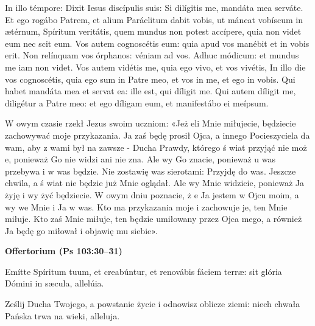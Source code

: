 \documentclass[10pt,a5paper]{book}
\newcommand{\oremus}[3]{\medskip\centerline{\textbf{#1}}\medskip
	\begin{sloppypar}
		\begin{paracol}{2}
			\setlength{\columnsep}{0em}
			\begin{leftcolumn}
				#2
			\end{leftcolumn}
			\begin{rightcolumn}
				#3
			\end{rightcolumn}
		\end{paracol}
	\end{sloppypar}}
\newcommand{\oremuss}[2]{
	\begin{sloppypar}
		\begin{paracol}{2}
			\setlength{\columnsep}{0em}
			\begin{leftcolumn}
				#1
			\end{leftcolumn}
			\begin{rightcolumn}
				#2
			\end{rightcolumn}
		\end{paracol}
	\end{sloppypar}}
\begin{document}
					\oremuss{
						In illo témpore: Dixit Iesus discípulis suis: Si dilígitis me, mandáta mea serváte. Et ego rogábo Patrem, et alium Paráclitum dabit vobis, ut máneat vobíscum in ætérnum, Spíritum veritátis, quem mundus non potest accípere, quia non videt eum nec scit eum. Vos autem cognoscétis eum: quia apud vos manébit et in vobis erit. Non relínquam vos órphanos: véniam ad vos. Adhuc módicum: et mundus me iam non videt. Vos autem vidétis me, quia ego vivo, et vos vivétis, In illo die vos cognoscétis, quia ego sum in Patre meo, et vos in me, et ego in vobis. Qui habet mandáta mea et servat ea: ille est, qui díligit me. Qui autem díligit me, diligétur a Patre meo: et ego díligam eum, et manifestábo ei meípsum.}{
						W owym czasie rzekł Jezus swoim uczniom: «Jeż eli Mnie miłujecie, będziecie zachowywać moje przykazania. Ja zaś będę prosił Ojca, a innego Pocieszyciela da wam, aby z wami był na zawsze - Ducha Prawdy, którego ś wiat przyjąć nie moż e, ponieważ Go nie widzi ani nie zna. Ale wy Go znacie, ponieważ u was przebywa i w was będzie. Nie zostawię was sierotami: Przyjdę do was. Jeszcze chwila, a ś wiat nie będzie już Mnie oglądał. Ale wy Mnie widzicie, ponieważ Ja żyję i wy żyć będziecie. W owym dniu poznacie, ż e Ja jestem w Ojcu moim, a wy we Mnie i Ja w was. Kto ma przykazania moje i zachowuje je, ten Mnie miłuje. Kto zaś Mnie miłuje, ten będzie umiłowany przez Ojca mego, a również Ja będę go miłował i objawię mu siebie».}
					
					\oremus{Offertorium (Ps 103:30--31)}{
						Emítte Spíritum tuum, et creabúntur, et renovábis fáciem terræ: sit glória Dómini in s\ae cula, allelúia.}{
						Ześlij Ducha Twojego, a powstanie życie i odnowisz oblicze ziemi: niech chwała Pańska trwa na wieki, alleluja.}
					
\end{document}
